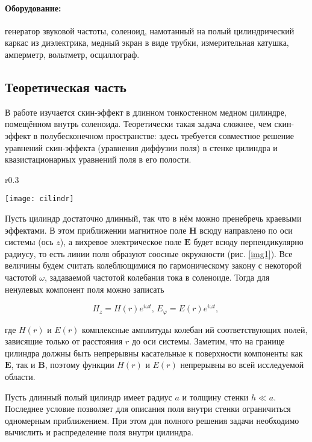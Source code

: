 \documentclass[a4paper,12pt]{article} %
\begin{document}
\paragraph{Оборудование:} генератор звуковой частоты, соленоид, намотанный на полый цилиндрический каркас из диэлектрика, медный экран в виде трубки, измерительная катушка, амперметр, вольтметр, осциллограф.

\subsection{Теоретическая часть}

В работе изучается скин-эффект в длинном тонкостенном медном цилиндре, помещённом внутрь соленоида. Теоретически такая задача сложнее, чем скин-эффект в полубесконечном пространстве: здесь требуется совместное решение уравнений скин-эффекта (уравнения диффузии поля) в стенке цилиндра и квазистационарных уравнений поля в его полости.

\begin{wrapfigure}[18]{r}{0.3\textwidth}
    \begin{center}
    \texttt{[image: cilindr]}
\end{center}
\label{img1}
\caption{Электрическое и магнитное в тонкостенном цилиндре}
\end{wrapfigure}

Пусть цилиндр достаточно длинный, так что в нём можно пренебречь краевыми эффектами. В этом приближении магнитное поле $\textbf{H}$ всюду направлено по оси системы (ось $\textit{z}$), а вихревое электрическое поле $\textbf{E}$ будет всюду перпендикулярно радиусу, то есть линии поля образуют соосные окружности (рис. \ref{img1}). Все величины будем считать колеблющимися по гармоническому закону с некоторой частотой $\omega$, задаваемой частотой колебания тока в соленоиде.
Тогда для ненулевых компонент поля можно записать

\[ H_z = H(r)e^{i\omega t} \text{, } E_\varphi = E(r)e^{i\omega t} \text{, } \]

где $H(r)$ и $E(r)$ комплексные амплитуды колебан ий соответствующих полей, зависящие только от расстояния $r$ до оси системы. Заметим, что на границе цилиндра должны быть непрерывны касательные к поверхности компоненты как $\textbf{E}$,
так и $\textbf{B}$, поэтому функции $H(r)$ и $E(r)$ непрерывны во всей исследуемой области.

Пусть длинный полый цилиндр имеет радиус $a$ и толщину стенки $h \ll a$. Последнее
условие позволяет для описания поля внутри стенки ограничиться одномерным приближением. При этом для полного решения задачи необходимо вычислить и распределение поля внутри цилиндра.
\end{document}
